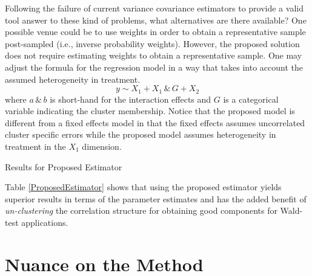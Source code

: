 \documentclass{jbsc}
\begin{document}
Following the failure of current variance covariance estimators to provide a valid tool answer to these kind of problems, what alternatives are there available? One possible venue could be to use weights in order to obtain a representative sample post-sampled (i.e., inverse probability weights). However, the proposed solution does not require estimating weights to obtain a representative sample. One may adjust the formula for the regression model in a way that takes into account the assumed heterogeneity in treatment.
\begin{equation}
y \sim X_{1} + X_{1}\,\&\,G + X_{2}
\end{equation}
where $a\,\&\,b$ is short-hand for the interaction effects and $G$ is a categorical variable indicating the cluster membership. Notice that the proposed model is different from a fixed effects model in that the fixed effects assumes uncorrelated cluster specific errors while the proposed model assumes heterogeneity in treatment in the $X_{1}$ dimension.

\begin{table}[hbpt]
	\centering
	\caption{Results for Proposed Estimator}
	\label{ProposedEstimator}
	
\end{table}

Table \ref{ProposedEstimator} shows that using the proposed estimator yields superior results in terms of the parameter estimates and has the added benefit of \textit{un-clustering} the correlation structure for obtaining good components for Wald-test applications.

\section{Nuance on the Method}
\end{document}
